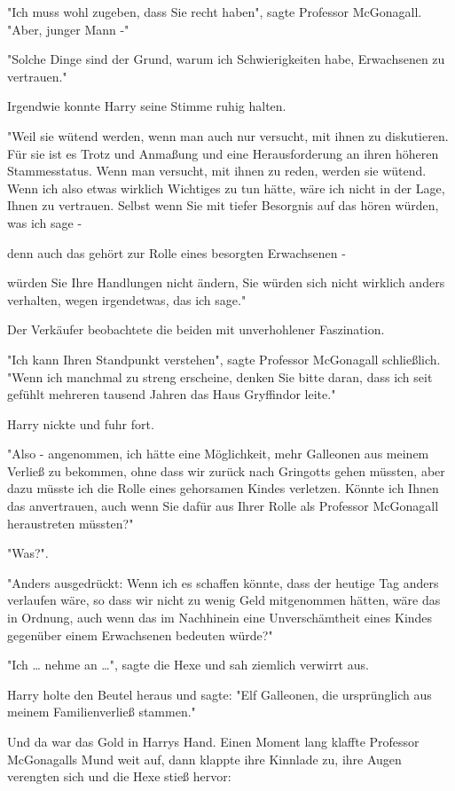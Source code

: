 {"Ich muss wohl zugeben, dass Sie recht haben", sagte Professor McGonagall. "Aber, junger Mann -"

"Solche Dinge sind der Grund, warum ich Schwierigkeiten habe, Erwachsenen zu vertrauen."

Irgendwie konnte Harry seine Stimme ruhig halten.

"Weil sie wütend werden, wenn man auch nur versucht, mit ihnen zu diskutieren. Für sie ist es Trotz und Anmaßung und eine Herausforderung an ihren höheren Stammesstatus. Wenn man versucht, mit ihnen zu reden, werden sie wütend. Wenn ich also etwas wirklich Wichtiges zu tun hätte, wäre ich nicht in der Lage, Ihnen zu vertrauen. Selbst wenn Sie mit tiefer Besorgnis auf das hören würden, was ich sage -

denn auch das gehört zur Rolle eines besorgten Erwachsenen -

würden Sie Ihre Handlungen nicht ändern, Sie würden sich nicht wirklich anders verhalten, wegen irgendetwas, das ich sage."

Der Verkäufer beobachtete die beiden mit unverhohlener Faszination.

"Ich kann Ihren Standpunkt verstehen", sagte Professor McGonagall schließlich. "Wenn ich manchmal zu streng erscheine, denken Sie bitte daran, dass ich seit gefühlt mehreren tausend Jahren das Haus Gryffindor leite."

Harry nickte und fuhr fort.

"Also - angenommen, ich hätte eine Möglichkeit, mehr Galleonen aus meinem Verließ zu bekommen, ohne dass wir zurück nach Gringotts gehen müssten, aber dazu müsste ich die Rolle eines gehorsamen Kindes verletzen. Könnte ich Ihnen das anvertrauen, auch wenn Sie dafür aus Ihrer Rolle als Professor McGonagall heraustreten müssten?"

"Was?".

"Anders ausgedrückt: Wenn ich es schaffen könnte, dass der heutige Tag anders verlaufen wäre, so dass wir nicht zu wenig Geld mitgenommen hätten, wäre das in Ordnung, auch wenn das im Nachhinein eine Unverschämtheit eines Kindes gegenüber einem Erwachsenen bedeuten würde?"

"Ich … nehme an …", sagte die Hexe und sah ziemlich verwirrt aus.

Harry holte den Beutel heraus und sagte: "Elf Galleonen, die ursprünglich aus meinem Familienverließ stammen."

Und da war das Gold in Harrys Hand. Einen Moment lang klaffte Professor McGonagalls Mund weit auf, dann klappte ihre Kinnlade zu, ihre Augen verengten sich und die Hexe stieß hervor:

}
